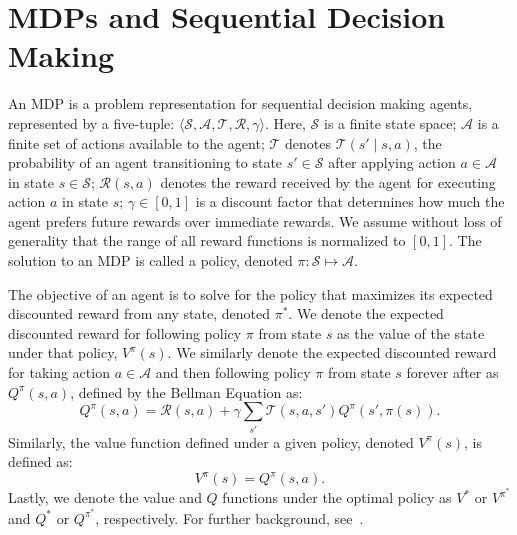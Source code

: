 \section{\acp{MDP} and Sequential Decision Making}



An \ac{MDP} is a problem representation for sequential decision making agents, represented by a five-tuple: $\langle \mathcal{S}, \mathcal{A}, \mathcal{T}, \mathcal{R}, \gamma \rangle$. Here, $\mathcal{S}$ is a finite state space; $\mathcal{A}$ is a finite set of actions available to the agent; $\mathcal{T}$ denotes $\mathcal{T}(s' \mid s,a)$, the probability of an agent transitioning to state $s' \in \mathcal{S}$ after applying action $a \in \mathcal{A}$ in state $s \in \mathcal{S}$; $\mathcal{R}(s,a)$ denotes the reward received by the agent for executing action $a$ in state $s$; $\gamma \in [0, 1]$ is a discount factor that determines how much the agent prefers future rewards over immediate rewards. We assume without loss of generality that the range of all reward functions is normalized to $[0,1]$. The solution to an \ac{MDP} is called a policy, denoted $\pi: \mathcal{S} \mapsto \mathcal{A}$.

The objective of an agent is to solve for the policy that maximizes its expected discounted reward from any state, denoted $\pi^*$. We denote the expected discounted reward for following policy $\pi$ from state $s$ as the value of the state under that policy, $V^\pi(s)$. We similarly denote the expected discounted reward for taking action $a \in \mathcal{A}$ and then following policy $\pi$ from state $s$ forever after as $Q^\pi(s,a)$, defined by the Bellman Equation as:
\begin{equation}
Q^\pi(s,a) = \mathcal{R}(s,a) + \gamma \sum_{s'} \mathcal{T}(s,a,s') Q^\pi(s',\pi(s)).
\end{equation}
Similarly, the value function defined under a given policy, denoted $V^\pi(s)$, is defined as:
\begin{equation}
V^\pi(s) = Q^\pi(s,a).
\end{equation}
Lastly, we denote the value and $Q$ functions under the optimal policy as $V^*$ or $V^{\pi^*}$ and $Q^*$ or $Q^{\pi^*}$, respectively. For further background, see~\citet{kaelbling1996reinforcement}.
